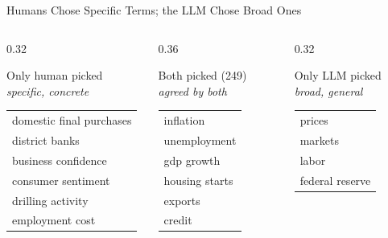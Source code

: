 \documentclass[10pt,aspectratio=169]{beamer}
\begin{document}
\begin{frame}{Humans Chose Specific Terms; the LLM Chose Broad Ones}
  \vspace{-4pt}
  \begin{columns}[T]
    \begin{column}{0.32\textwidth}
      \begin{block}{Only human picked}
        \centering\footnotesize\textit{specific, concrete}\\[2pt]
        \begin{tabular}{l}
          domestic final purchases\\
          district banks\\
          business confidence\\
          consumer sentiment\\
          drilling activity\\
          employment cost\\
        \end{tabular}
      \end{block}
    \end{column}
    \begin{column}{0.36\textwidth}
      \begin{block}{Both picked (249)}
        \centering\footnotesize\textit{agreed by both}\\[2pt]
        \begin{tabular}{l}
          inflation\\
          unemployment\\
          gdp growth\\
          housing starts\\
          exports\\
          credit\\
        \end{tabular}
      \end{block}
    \end{column}
    \begin{column}{0.32\textwidth}
      \begin{block}{Only LLM picked}
        \centering\footnotesize\textit{broad, general}\\[2pt]
        \begin{tabular}{l}
          prices\\
          markets\\
          labor\\
          federal reserve\\

\end{tabular}
\end{block}
\end{column}
\end{columns}
\end{frame}
\end{document}
